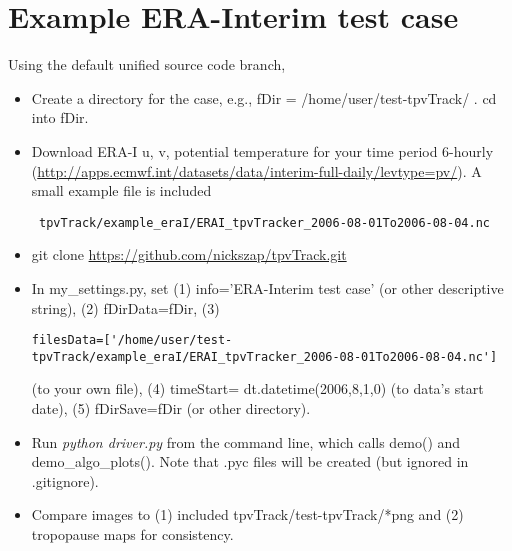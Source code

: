 \documentclass[a4paper]{article}
\begin{document}
\section{Example ERA-Interim test case}
Using the default unified source code branch,
\begin{itemize}
\item Create a directory for the case, e.g., fDir = /home/user/test-tpvTrack/ . cd into fDir.
\item Download ERA-I u, v, potential temperature for your time period 6-hourly (\url{http://apps.ecmwf.int/datasets/data/interim-full-daily/levtype=pv/}). A small example file is included \begin{verbatim} tpvTrack/example_eraI/ERAI_tpvTracker_2006-08-01To2006-08-04.nc \end{verbatim}
\item git clone \url{https://github.com/nickszap/tpvTrack.git}
\item In my\_settings.py, set (1) info='ERA-Interim test case' (or other descriptive string), (2) fDirData=fDir, (3) \begin{verbatim}filesData=['/home/user/test-tpvTrack/example_eraI/ERAI_tpvTracker_2006-08-01To2006-08-04.nc']\end{verbatim} (to your own file), (4) timeStart= dt.datetime(2006,8,1,0) (to data's start date), (5) fDirSave=fDir (or other directory).
\item Run \emph{python driver.py} from the command line, which calls demo() and demo\_algo\_plots(). Note that .pyc files will be created (but ignored in .gitignore).
\item Compare images to (1) included tpvTrack/test-tpvTrack/*png and (2) tropopause maps for consistency.

\end{itemize}
\end{document}
